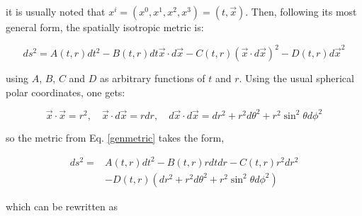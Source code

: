 \documentclass[letterpaper,11pt,onecolumn]{article}
\begin{document}
it is usually noted that $x^i=(x^0,x^1,x^2,x^3)=(t,\vec{x})$. Then, following its most general form, the spatially isotropic metric is:

\begin{equation}
d s^{2}=A(t, r) d t^{2}-B(t, r) d t \vec{x} \cdot d \vec{x}-C(t, r)(\vec{x} \cdot d \vec{x})^{2}-D(t, r) d \vec{x}^{2}
\label{genmetric}
\end{equation}

using $A$, $B$, $C$ and $D$ as arbitrary functions of $t$ and $r$. Using the usual spherical polar coordinates, one gets:

\begin{equation}
\vec{x} \cdot \vec{x}=r^{2}, \quad \vec{x} \cdot d \vec{x}=r d r, \quad d \vec{x} \cdot d \vec{x}=d r^{2}+r^{2} d \theta^{2}+r^{2} \sin ^{2} \theta d \phi^{2} \nonumber
\end{equation}

so the metric from Eq. \ref{genmetric} takes the form,

\begin{equation}
\begin{aligned}
d s^{2}=& A(t, r) d t^{2}-B(t, r) r d t d r-C(t, r) r^{2} d r^{2} \\
&-D(t, r)\left(d r^{2}+r^{2} d \theta^{2}+r^{2} \sin ^{2} \theta d \phi^{2}\right)
\end{aligned}\nonumber
\end{equation}

which can be rewritten as 
\end{document}
